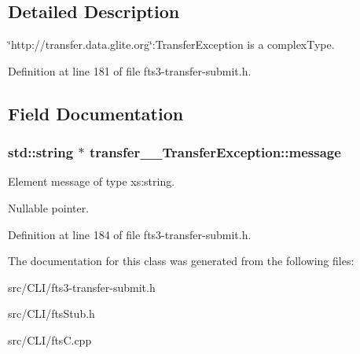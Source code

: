 \subsection{Detailed Description}
\char`\"{}http://transfer.data.glite.org\char`\"{}:TransferException is a complexType. 

Definition at line 181 of file fts3-\/transfer-\/submit.h.



\subsection{Field Documentation}
\subsubsection[{message}]{\setlength{\rightskip}{0pt plus 5cm}std::string $\ast$ {\bf transfer\_\-\_\-TransferException::message}}\label{classtransfer____TransferException_ab7d44de4ff3d40739362d125663eeb09}


Element message of type xs:string. 

Nullable pointer. 

Definition at line 184 of file fts3-\/transfer-\/submit.h.



The documentation for this class was generated from the following files:\begin{DoxyCompactItemize}
\item 
src/CLI/fts3-\/transfer-\/submit.h\item 
src/CLI/ftsStub.h\item 
src/CLI/ftsC.cpp\end{DoxyCompactItemize}
